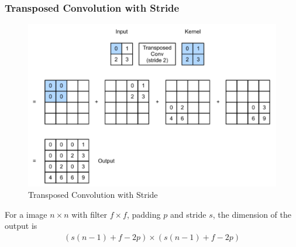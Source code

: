 \documentclass[11pt,a4paper]{article}
\begin{document}
\subsubsection*{Transposed Convolution with Stride}
\begin{center}\begin{figure}[htbp]
    \centering
    \includegraphics[scale=0.2]{Transposed Convolution With stride .png}
    \caption{Transposed Convolution with Stride}
    \label{}
\end{figure}\end{center}
For a image $n\times n$ with filter $f\times f$, padding $p$ and stride $s$, the dimension of the output is
\begin{equation}
    \begin{aligned}
        (s(n-1)+f-2p)\times (s(n-1)+f-2p)
    \end{aligned}
    \nonumber
\end{equation}
\end{document}
